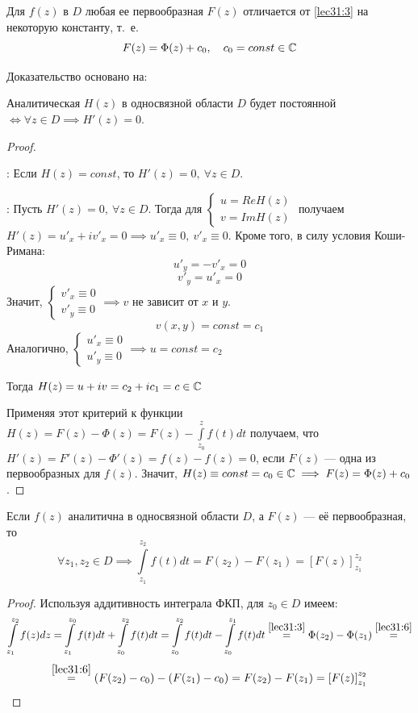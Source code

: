 \documentclass[../../main.tex]{subfiles}
\begin{document}
\begin{crl*}
	Для $ f(z) $ в $D$ любая ее первообразная $F(z)$ отличается от
	\eqref{lec31:3} на некоторую константу,
	т.~е.
	\begin{equation}
	\label{lec31:6}
		F(z) = \Phi(z) + c_0, \ \ \ c_0 = const \in \mathbb{C}
	\end{equation}
\end{crl*}
Доказательство основано на:
\begin{thm}
	Аналитическая $H(z)$ в односвязной области $D$ будет постоянной
	$\iff \forall z \in D \implies H'(z) = 0$.
\end{thm}
\begin{proof} ~

\nec:
Если $H(z) = const$, то $H'(z) = 0, \ \forall z \in D$.

\suff:
Пусть $H'(z) = 0, \ \forall z \in D$. Тогда для $\begin{cases}
	u = Re H(z) \\
	v = Im H(z)
\end{cases}$ получаем $H'(z) = u'_x + i v'_x = 0 \implies
u'_x \equiv 0, \ v'_x \equiv 0$. Кроме того, в силу условия Коши-Римана:
\[ u'_y = -v'_x = 0 \]
\[ v'_y = u'_x = 0 \]
Значит, $\begin{cases} v'_x \equiv 0 \\ v'_y \equiv 0
\end{cases} \implies v $ не зависит от $x$ и $y$.
\[ v(x, y) = const = c_1 \]
Аналогично, $\begin{cases} u'_x \equiv 0 \\ u'_y \equiv 0
\end{cases} \implies u = const = c_2 $

Тогда $H(z) = u + i v = c_2 + i c_1 = c \in \mathbb{C} $

Применяя этот критерий к функции $ H(z) = F(z) - \Phi(z) = F(z) -
\int\limits_{z_0}^z f(t) dt $ получаем, что $ H'(z) = F'(z) - \Phi ' (z) =
f(z) - f(z) = 0$, если $F(z)$ --- одна из первообразных для $f(z)$.
Значит, $H(z) \equiv const = c_0 \in \mathbb{C} \implies F(z) = \Phi(z) + c_0$.
\end{proof}
\begin{rem}
	Если $f(z)$ аналитична в односвязной области $D$, а $F(z)$ --- её
	первообразная, то
	\begin{equation}
		\label{lec31:7}
		\forall z_1, z_2 \in D \implies \int\limits_{z_1}^{z_2} f(t) dt =
		F(z_2) - F(z_1) = \left[ F(z) \right]_{z_1}^{z_2} 
	\end{equation}
\begin{proof}
	Используя аддитивность интеграла ФКП, для $z_0 \in D$ имеем:
	\[ \int\limits_{z_1}^{z_2} f(z) dz =
	\int\limits_{z_1}^{z_0} f(t) dt + \int\limits_{z_0}^{z_2} f(t) dt =
	\int\limits_{z_0}^{z_2} f(t) dt - \int\limits_{z_0}^{z_1} f(t) dt
	\stackrel{ \eqref{lec31:3} }{=} \Phi(z_2) - \Phi(z_1)
	\stackrel{ \eqref{lec31:6} }{=}
	\] \[
	\stackrel{ \eqref{lec31:6} }{=} (F(z_2) - c_0) - (F(z_1) - c_0) =
	F(z_2) - F(z_1) = \left[ F(z) \right]_{z_1}^{z_2}
	\]
\end{proof}
\end{rem}
\end{document}
